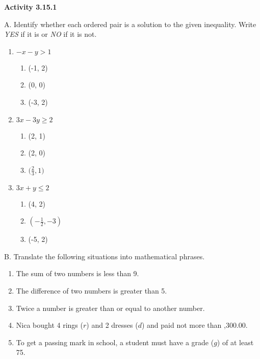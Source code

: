\vspace{0.3ex}
\noindent  \textbf{Activity 3.15.1}

\vspace{0.2ex}

A. Identify whether each ordered pair is a solution to the given inequality. Write \emph{YES} if it is or \emph{NO} if it is not.


\begin{multicols}{3}
\begin{enumerate}%
\item $-x-y>1$
\begin{enumerate}%
\item (-1, 2)
\item (0, 0)
\item (-3, 2) 
\end{enumerate}   

\nextcolumn

\item $3x-3y \geq 2$
\begin{enumerate}%
\item (2, 1)
\item (2, 0)
\item $\big(\displaystyle \frac{2}{3}, 1\big)$
\end{enumerate}  

\nextcolumn

\item $3x+y \leq 2$
\begin{enumerate}%
\item (4, 2)
\item $(-\displaystyle \frac{1}{2}, -3)$
\item (-5, 2)

\end{enumerate}  
\end{enumerate}  
\end{multicols} 
B. Translate the following situations into mathematical phrases.
\begin{enumerate}%
\item The sum of two numbers is less than 9.
\item The difference of two numbers is greater than 5.
\item Twice a number is greater than or equal to another number.
\item Nica bought 4 rings ($r$) and 2 dresses ($d$) and paid not more than ,300.00.
\item To get a passing mark in school, a student must have a grade ($g$) of at least 75.
\end{enumerate}  

